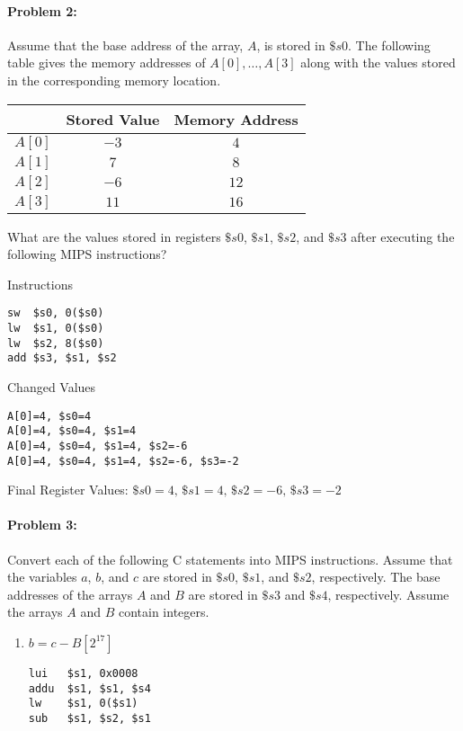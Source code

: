 \documentclass[12pt,letterpaper,titlepage]{article}
\begin{document}
\begin{raggedright}
\begin{enumerate}
\end{enumerate}
\clearpage
\paragraph{Problem 2: }
Assume that the base address of the array, $A$, is stored in $\$s0$. The following table gives the memory addresses of $A[0], \ldots ,A[3]$ along with the values stored in the corresponding memory location.
\begin{center}
\begin{tabular}{|c|c|c|}
\hline
       & Stored Value 	& Memory Address 	\\\hline 
$A[0]$ & $-3$ 			&  $4$ 				\\\hline 
$A[1]$ &  $7$ 			&  $8$ 				\\\hline 
$A[2]$ & $-6$ 			& $12$ 				\\\hline 
$A[3]$ & $11$ 			& $16$ 				\\\hline 
\end{tabular} 
\end{center}
What are the values stored in registers $\$s0$, $\$s1$, $\$s2$, and $\$s3$ after executing the following MIPS instructions?
\begin{paracol}{2}
\centering
Instructions
\begin{lstlisting}
sw  $s0, 0($s0) 
lw  $s1, 0($s0)
lw  $s2, 8($s0)
add $s3, $s1, $s2
\end{lstlisting}
\switchcolumn
\centering
Changed Values
\begin{lstlisting}
A[0]=4, $s0=4
A[0]=4, $s0=4, $s1=4
A[0]=4, $s0=4, $s1=4, $s2=-6
A[0]=4, $s0=4, $s1=4, $s2=-6, $s3=-2
\end{lstlisting}
\end{paracol}

Final Register Values: $\$s0=4,\, \$s1=4,\, \$s2=-6,\, \$s3=-2$

\clearpage
\paragraph{Problem 3: }
Convert each of the following C statements into MIPS instructions. Assume that the variables $a$, $b$, and $c$ are stored in $\$s0$, $\$s1$, and $\$s2$, respectively. The base addresses of the arrays $A$ and $B$ are stored in $\$s3$ and $\$s4$, respectively. Assume the arrays $A$ and $B$ contain integers.
\begin{enumerate}
\item $b = c - B[2^{17}]$
\begin{lstlisting}
lui   $s1, 0x0008
addu  $s1, $s1, $s4
lw    $s1, 0($s1)
sub   $s1, $s2, $s1
\end{lstlisting}


\end{enumerate}
\end{raggedright}
\end{document}
